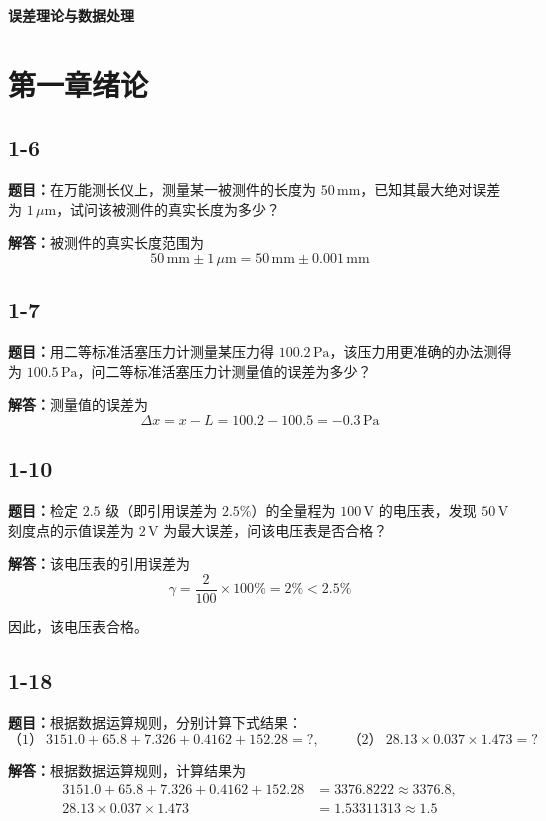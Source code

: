 \documentclass[UTF8,zihao=-4]{ctexart}
\newcommand{\problem}[1]{\subsection*{#1}}
\newcommand{\timu}{\noindent\textbf{题目：}}
\newcommand{\jieda}{\noindent\textbf{解答：}}
\begin{document}
\begin{center}
    {\LARGE \textbf{误差理论与数据处理}}
\end{center}

{\color{black}


\section*{第一章\quad 绪论}

\problem{1-6}

\timu 在万能测长仪上，测量某一被测件的长度为 $50\,\mathrm{mm}$，已知其最大绝对误差为 $1\,\mu\mathrm{m}$，试问该被测件的真实长度为多少？

\jieda 被测件的真实长度范围为
\begin{equation*}
    50\,\mathrm{mm}\pm1\,\mu\mathrm{m}
    =50\,\mathrm{mm}\pm0.001\,\mathrm{mm}
\end{equation*}

\problem{1-7}

\timu 用二等标准活塞压力计测量某压力得 $100.2\,\mathrm{Pa}$，该压力用更准确的办法测得为 $100.5\,\mathrm{Pa}$，问二等标准活塞压力计测量值的误差为多少？

\jieda 测量值的误差为
\begin{equation*}
    \Delta x=x-L=100.2-100.5=-0.3\,\mathrm{Pa}
\end{equation*}

\problem{1-10}

\timu 检定 $2.5$ 级（即引用误差为 $2.5\%$）的全量程为 $100\,\mathrm{V}$ 的电压表，发现 $50\,\mathrm{V}$ 刻度点的示值误差为 $2\,\mathrm{V}$ 为最大误差，问该电压表是否合格？

\jieda 该电压表的引用误差为
\begin{equation*}
    \gamma=\frac{2}{100}\times100\%=2\%<2.5\%
\end{equation*}

因此，该电压表合格。

\problem{1-18}

\timu 根据数据运算规则，分别计算下式结果：
\begin{equation*}
    \text{（1）}\ 3151.0+65.8+7.326+0.4162+152.28=?,
    \qquad
    \text{（2）}\ 28.13\times0.037\times1.473=?
\end{equation*}

\jieda 根据数据运算规则，计算结果为
\begin{equation*}
\begin{aligned}
    3151.0+65.8+7.326+0.4162+152.28
    &=3376.8222\approx3376.8,\\
    28.13\times0.037\times1.473
    &=1.53311313\approx1.5
\end{aligned}
\end{equation*}


}
\end{document}
